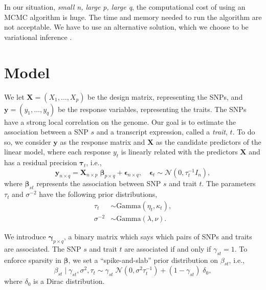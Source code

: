 \documentclass[a4paper, 11pt]{report}
\numberwithin{equation}{chapter}
\begin{document}
In our situation, \textit{small n, large p, large q}, the computational cost of using an MCMC algorithm is huge. The time and memory needed to run the algorithm are not acceptable. We have to use an alternative solution, which we choose to be variational inference \cite{varInf}.
\newpage
\chapter{Model}
We let $\boldsymbol{X }= (X_1,\ldots,X_p)$ be the design matrix, representing the SNPs, and $\boldsymbol{y} = (y_1,\ldots,y_q)$ be the response variables, representing the traits. The SNPs have a strong local correlation on the genome. Our goal is to estimate the association between a SNP $s$ and a transcript expression, called a \textit{trait}, $t$. To do so, we consider $\boldsymbol{y}$ as the response matrix and $\boldsymbol{X}$ as the candidate predictors of the linear model, where each response $y_t$ is linearly related with the predictors $\boldsymbol{X}$ and has a residual precision $\boldsymbol{\tau}_t$, i.e.,
\begin{equation*}
\label{eq:model}
\boldsymbol{y}_{n\times q} = \boldsymbol{X}_{n \times p}\;\boldsymbol{\beta}_{p \times q}+\boldsymbol{\epsilon}_{n \times q},\quad\boldsymbol{\epsilon}_t \sim \mathcal{N}(0,\tau_t^{-1}I_n),
\end{equation*}
where $\boldsymbol{\beta}_{st}$ represents the association between SNP $s$ and trait $t$. The parameters $\tau_t$ and $\sigma^{-2}$ have the following prior distributions,
\begin{align*}
\tau_t &\sim \text{Gamma}(\eta_t,\kappa_t),\\
\sigma^{-2} &\sim \text{Gamma}(\lambda,\nu).
\end{align*}

We introduce $\boldsymbol{\gamma}_{p\times q}$, a binary matrix which says which pairs of SNPs and traits are associated. The SNP $s$ and trait $t$ are associated if and only if $\gamma_{st} = 1$. To enforce sparsity in $\boldsymbol{\beta}$, we set a ``spike-and-slab'' prior distribution on $\beta_{st}$, i.e.,
\begin{equation*}
\beta_{st} \mid \gamma_{st},\sigma^2, \tau_t \sim \gamma_{st}\;\mathcal{N}(0,\sigma^2\tau_t^{-1})+(1-\gamma_{st})\;\delta_0,
\end{equation*}
where $\delta_0$ is a Dirac distribution.
\end{document}
